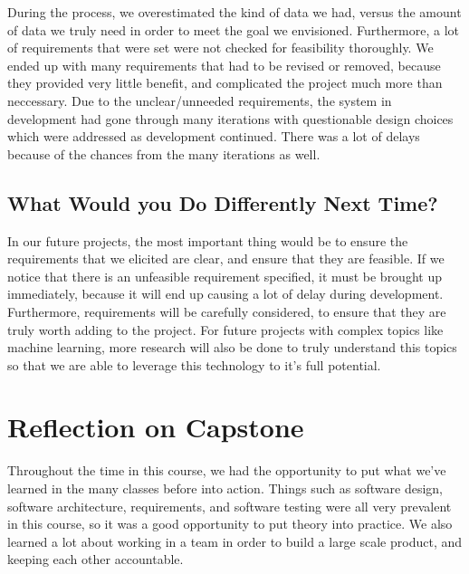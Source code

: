 \documentclass{article}
\begin{document}
During the process, we overestimated the kind of data we had, versus the amount
of data we truly need in order to meet the goal we envisioned. Furthermore, a
lot of requirements that were set were not checked for feasibility thoroughly.
We ended up with many requirements that had to be revised or removed, because
they provided very little benefit, and complicated the project much more than
neccessary. Due to the unclear/unneeded requirements, the system in development
had gone through many iterations with questionable design choices which were
addressed as development continued. There was a lot of delays because of the
chances from the many iterations as well. 

\subsection{What Would you Do Differently Next Time?}

In our future projects, the most important thing would be to ensure the
requirements that we elicited are clear, and ensure that they are feasible. If
we notice that there is an unfeasible requirement specified, it must be brought
up immediately, because it will end up causing a lot of delay during
development. Furthermore, requirements will be carefully considered, to ensure
that they are truly worth adding to the project. For future projects with
complex topics like machine learning, more research will also be done to truly
understand this topics so that we are able to leverage this technology to it's
full potential.

\section{Reflection on Capstone}

Throughout the time in this course, we had the opportunity to put what we've
learned in the many classes before into action. Things such as software design,
software architecture, requirements, and software testing were all very
prevalent in this course, so it was a good opportunity to put theory into
practice. We also learned a lot about working in a team in order to build a
large scale product, and keeping each other accountable.
\end{document}

